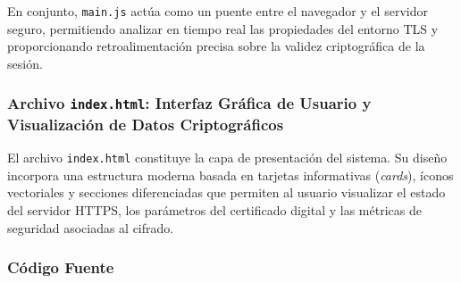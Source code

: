 En conjunto, \texttt{main.js} actúa como un puente entre el navegador y el servidor seguro, permitiendo analizar en tiempo real las propiedades del entorno TLS y proporcionando retroalimentación precisa sobre la validez criptográfica de la sesión.

\subsubsection{Archivo \texttt{index.html}: Interfaz Gráfica de Usuario y Visualización de Datos Criptográficos}

El archivo \texttt{index.html} constituye la capa de presentación del sistema. Su diseño incorpora una estructura moderna basada en tarjetas informativas (\textit{cards}), íconos vectoriales y secciones diferenciadas que permiten al usuario visualizar el estado del servidor HTTPS, los parámetros del certificado digital y las métricas de seguridad asociadas al cifrado.

\subsubsection*{Código Fuente}

